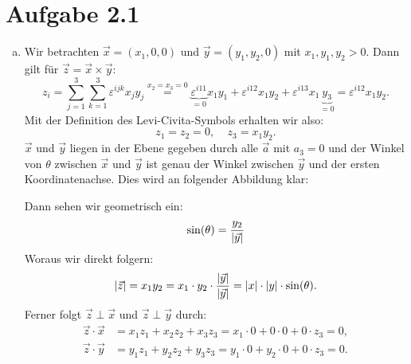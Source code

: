 \documentclass{theozettel}
\renewcommand{\epsilon}{\varepsilon}
\begin{document}

\section*{Aufgabe 2.1}
\begin{enumerate}[(a)]
	\item 	Wir betrachten $\vec{x} = (x_{1}, 0, 0)$ und $\vec{y}=(y_{1},y_{2},0)$ mit $x_{1}, y_{1}, y_{2} > 0$. Dann gilt für $\vec{z} = \vec{x} \times \vec{y}$:
			\[
				z_{i} = \sum_{j=1}^{3}\sum_{k=1}^{3} \epsilon^{ijk}x_{j}y_{j} \stackrel{x_{2}=x_{3}=0}{=} \underbrace{\epsilon^{i11}}_{= 0}x_{1}y_{1} + \epsilon^{i12}x_{1}y_{2} + \epsilon^{i13}x_{1}\underbrace{y_{3}}_{= 0} = \epsilon^{i12}x_{1}y_{2}.
			\]
			Mit der Definition des Levi-Civita-Symbols erhalten wir also:
			\[
				z_{1} = z_{2} = 0, \ \ \ \ \  z_{3} = x_{1}y_{2}.
			\]
			$\vec{x}$ und $\vec{y}$ liegen in der Ebene gegeben durch alle $\vec{a}$ mit $a_{3} = 0$ und der Winkel von $\theta$ zwischen $\vec{x}$ und $\vec{y}$ ist genau der Winkel zwischen $\vec{y}$ und der ersten Koordinatenachse. Dies wird an folgender Abbildung klar:
			\begin{figure}[h]
			\centering
			\end{figure}
			
			Dann sehen wir geometrisch ein:
			\[
				\sin(\theta) = \frac{y_{2}}{\qty|\vec{y}|}
			\]
			Woraus wir direkt folgern:
			\[
				\qty|\vec{z}| = x_{1}y_{2} =x_{1} \cdot y_{2} \cdot \frac{\qty|\vec{y}|}{\qty|\vec{y}|} = \qty|x| \cdot \qty|y| \cdot \sin(\theta).
			\]
			Ferner folgt $\vec{z} \perp \vec{x}$ und $\vec{z} \perp \vec{y}$ durch:
			\begin{align*}
				\vec{z} \cdot \vec{x} &= x_{1}z_{1} + x_{2}z_{2} + x_{3}z_{3} = x_{1} \cdot 0 + 0 \cdot 0 + 0 \cdot z_{3} = 0, \\
				\vec{z} \cdot \vec{y} &= y_{1}z_{1} + y_{2}z_{2} + y_{3}z_{3} = y_{1} \cdot 0 + y_{2} \cdot 0 + 0 \cdot z_{3} = 0.
			\end{align*}
			

\end{enumerate}
\end{document}

